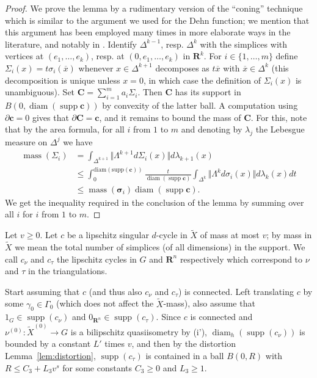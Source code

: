 \documentclass[12pt]{amsart}
\theoremstyle{definition}
\begin{document}
\begin{proof}
We prove the lemma by a rudimentary version of the ``coning'' technique which is similar to the argument we used for the Dehn function; we mention that this argument has been employed many times in more elaborate ways in the literature, and notably in \cite{MR2153909}.
    Identify $\Delta^{k-1}$, resp. $\Delta^k$ with the simplices with vertices at $(e_1, \ldots, e_k)$, resp. at $(0,e_1, \ldots, e_k)$ in $\mathbf R^k$.
    For $i \in \{1,\ldots, m\}$ define $\Sigma_i(x) = t \sigma_i(\overline x)$ whenever $x \in \Delta^{k+1}$ decomposes as $t \overline x$ with $\overline x \in \Delta^k$ (this decomposition is unique unless $x=0$, in which case the definition of $\Sigma_i(x)$ is unambiguous).
    Set $\mathbf C = \sum_{i=1}^m a_i \Sigma_i$. Then $\mathbf C$ has its support in $B(0,\operatorname{diam}(\operatorname{supp} \mathbf c))$ by convexity of the latter ball.
    A computation using $\partial \mathbf c = 0$ gives that $\partial \mathbf C = \mathbf c$, and it remains to bound the mass of $\mathbf C$.
    For this, note that by the area formula, for all $i$ from $1$ to $m$ and denoting by $\lambda_j$ the Lebesgue measure on $\Delta^j$ we have
    \begin{align*}
        \operatorname{mass}(\Sigma_i) & = \int_{\Delta^{k+1}} \Vert \Lambda^{k+1} d \Sigma_i(x) \Vert d\lambda_{k+1}(x) \\
        & \leq \int_0^{\mathrm{diam}(\mathrm{supp}(\mathbf c))} \frac{t}{\operatorname{diam}(\operatorname{supp} \mathbf c)} \int_{\Delta^{k}} \Vert \Lambda^{k} d \sigma_i(x) \Vert d\lambda_k(x) dt \\
        & \leq \operatorname{mass}(\mathbf \sigma_i)\operatorname{diam}(\operatorname{supp} \mathbf c).
    \end{align*}
    We get the inequality required in the conclusion of the lemma by summing over all $i$ for $i$ from $1$ to $m$.
\end{proof}




Let $v \geqslant 0$.
Let $c$ be a lipschitz singular $d$-cycle in $\widetilde X$ of mass at most $v$; by mass in $\widetilde X$ we mean the total number of simplices (of all dimensions) in the support. 
We call $c_\nu$ and $c_{\tau}$ the lipschitz cycles in $G$ and $\mathbf R^n$ respectively which correspond to $\nu$ and $\tau$ in the triangulations.

Start assuming that $c$ (and thus also $c_\nu$ and $c_\tau$) is connected.
Left translating $c$ by some $\gamma_0 \in \Gamma_0$ (which does not affect the $\widetilde X$-mass), also assume that $1_G \in \operatorname{supp}(c_\nu)$ and $0_{\mathbf R^n} \in \operatorname{supp}(c_\tau)$.
Since $c$ is connected and $\nu^{(0)}: \widetilde X^{(0)} \to G$ is a bilipschitz quasiisometry by (i'), $\operatorname{diam}_h(\operatorname{supp}(c_\nu))$ is bounded by a constant $L'$ times $v$, and then by the distortion Lemma~\ref{lem:distortion}, $\operatorname{supp}(c_\tau)$ is contained in a ball $B(0,R)$ with $R \leqslant C_3+ L_3v^s$ for some constants $C_3 \geqslant 0$ and $L_3 \geqslant 1$.
\end{document}
